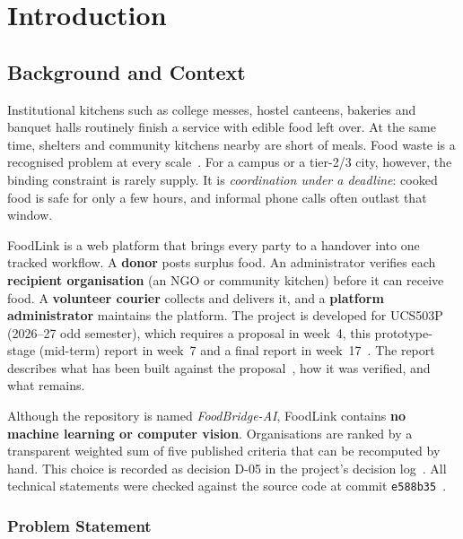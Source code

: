 \chapter{Introduction}
\label{ch:introduction}

\section{Background and Context}
\label{sec:background}

Institutional kitchens such as college messes, hostel canteens, bakeries and
banquet halls routinely finish a service with edible food left over. At the same
time, shelters and community kitchens nearby are short of meals. Food waste is a
recognised problem at every scale~\cite{unepFoodWaste2024}. For a campus or a
tier-2/3 city, however, the binding constraint is rarely supply. It is
\emph{coordination under a deadline}: cooked food is safe for only a few hours,
and informal phone calls often outlast that window.

FoodLink is a web platform that brings every party to a handover into one tracked
workflow. A \textbf{donor} posts surplus food. An administrator verifies each
\textbf{recipient organisation} (an NGO or community kitchen) before it can
receive food. A \textbf{volunteer courier} collects and delivers it, and a
\textbf{platform administrator} maintains the platform. The project is developed
for UCS503P (2026--27 odd semester), which requires a proposal in week~4, this
prototype-stage (mid-term) report in week~7 and a final report in
week~17~\cite{ucs503Project}. The report describes what has been built against
the proposal~\cite{foodlinkProposal}, how it was verified, and what remains.

Although the repository is named \emph{FoodBridge-AI}, FoodLink contains
\textbf{no machine learning or computer vision}. Organisations are ranked by a
transparent weighted sum of five published criteria that can be recomputed by
hand. This choice is recorded as decision D-05 in the project's decision
log~\cite{foodlinkArchitecture}. All technical statements were checked against
the source code at commit \texttt{e588b35}~\cite{foodlinkRepo}.

\subsection{Problem Statement}
\label{sec:problem}

